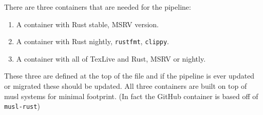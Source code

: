 There are three containers that are needed for the pipeline:

\begin{enumerate}
  \item A container with Rust stable, MSRV version.
  \item A container with Rust nightly, \texttt{rustfmt}, \texttt{clippy}.
  \item A container with all of TexLive and Rust, MSRV or nightly.
\end{enumerate}

These three are defined at the top of the file and if the pipeline is ever updated
or migrated these should be updated. All three containers are built on top of
musl systems for minimal footprint. (In fact the GitHub container is based off of \texttt{musl-rust})
